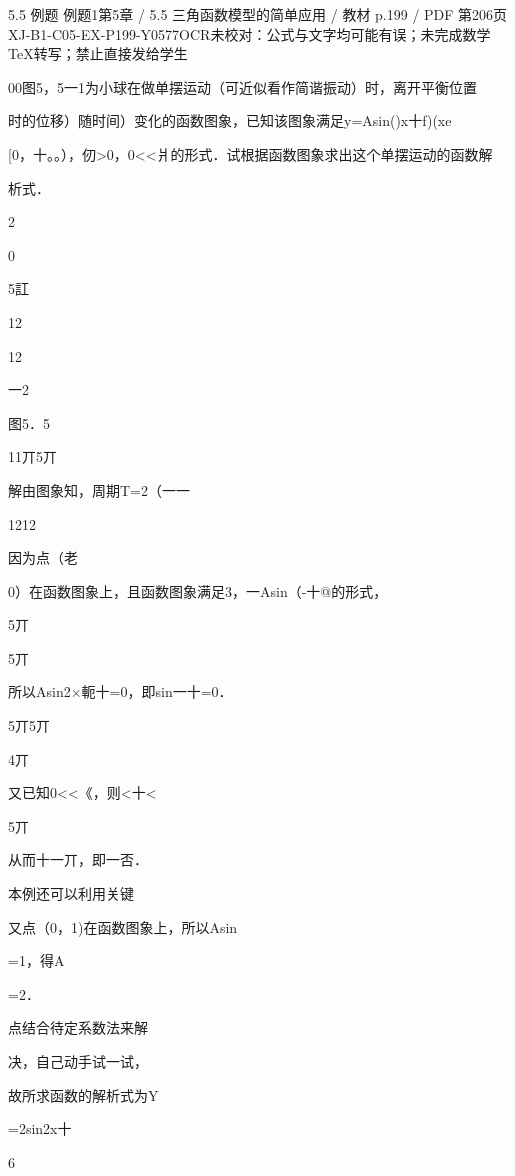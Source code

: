 \begin{bankitem}{5.5 例题 例题1}{第5章 / 5.5 三角函数模型的简单应用 / 教材 p.199 / PDF 第206页}{XJ-B1-C05-EX-P199-Y0577}{OCR未校对：公式与文字均可能有误；未完成数学TeX转写；禁止直接发给学生}
\begin{ocrdraft}
\par
00图5，5一1为小球在做单摆运动（可近似看作简谐振动）时，离开平衡位置
\par
时的位移）随时间）变化的函数图象，已知该图象满足y=Asin()x十f)(xe
\par
[0，十。。），仞>0，0<<爿的形式．试根据函数图象求出这个单摆运动的函数解
\par
析式．
\par
2
\par
0
\par
5訌
\par
12
\par
12
\par
一2
\par
图5．5
\par
11丌5丌
\par
解由图象知，周期T=2（一一
\par
1212
\par
因为点（老
\par
0）在函数图象上，且函数图象满足3，一Asin（-十@的形式，
\par
5丌
\par
5丌
\par
所以Asin2\ensuremath{\times}軛十=0，即sin一十=0．
\par
5丌5丌
\par
4丌
\par
又已知0<<《，则<十<
\par
5丌
\par
从而十一丌，即一否．
\par
本例还可以利用关键
\par
又点（0，1)在函数图象上，所以Asin
\par
=1，得A
\par
=2．
\par
点结合待定系数法来解
\par
决，自己动手试一试，
\par
故所求函数的解析式为Y
\par
=2sin2x十
\par
6
\end{ocrdraft}
\end{bankitem}
